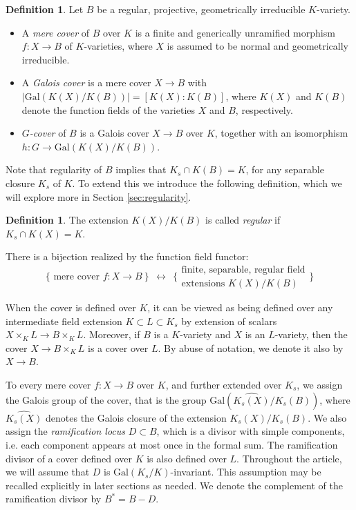 \documentclass[10pt]{amsart}
\theoremstyle{definition}
\newtheorem{definition}[theorem]{Definition}
\newcommand{\Gal}{{ \mathrm{Gal}}}
\begin{document}
\begin{definition}
Let $B$ be a regular, projective, geometrically irreducible $K$-variety. 
\begin{itemize}
  \item 
A  {\em mere cover} of $B$ over $K$ is a finite and generically unramified morphism $f\colon X \rightarrow B$  of $K$-varieties, where $X$ is assumed to be normal and geometrically irreducible. 
\item  A {\em Galois cover} is a mere cover $X \to B$ with $ |\Gal (K(X) / K(B)) |= [ K(X) : K(B)]  $, where $K(X)$ and $K(B)$ denote the function fields of the varieties $X$ and $B$, respectively. 
 \item 
{\em $G$-cover} of $B$ is a Galois cover $X \rightarrow B$ over $K$, together with an isomorphism $h\colon G \rightarrow \Gal(K(X)/K(B))$.
\end{itemize}
\end{definition}
Note that regularity of $B$ implies that $K_s \cap K(B) = K$, for any separable closure $K_s$ of $K$. To extend this we introduce the following definition, which we will explore more in Section \ref{sec:regularity}. 
\begin{definition}
  The extension $K(X)/K(B)$ is called {\em regular} if  $K_s \cap K(X)= K$.
\end{definition} 

There is a bijection realized by the function field functor:
\[
\Biggl\{\text{ mere cover } f \colon X \to B \ \Biggl\} \ \ \longleftrightarrow \ \  \Biggl\{ \begin{array}{c}
\text{finite, separable, regular field} \\
\text{extensions } K(X)/K(B)
\end{array} \Biggl\}
\]




When the cover is defined over $K$, it can be viewed as being defined over any intermediate field extension $K \subset L \subset K_s$ by extension of scalars $X\times_K L \to B \times_K L$. Moreover, if $B$ is a $K$-variety and $X$ is an $L$-variety, then the cover $X \to B \times_K L$ is a cover over $L$. By abuse of notation, we denote it also by $X \to B$.

To every mere cover $f \colon X\rightarrow B$ over $K$, and further extended over $K_s$,  we assign the Galois group of the cover, that is the group 
$\Gal(\widehat{K_s(X)}/K_s(B))$, where  $\widehat{K_s(X)}$ denotes the Galois closure of the extension $K_s(X)/K_s(B)$. 
We also assign the {\em ramification locus }  $D \subset B$, which is a divisor with simple components, i.e. each component appears at most once in the formal sum. The ramification divisor of a cover defined over $K$ is also defined over $L$. Throughout the article, we will assume that $D$ is $\Gal (K_s/K)$-invariant. This assumption may be recalled explicitly in later sections as needed. We denote the complement of the ramification divisor by $B^*= B - D$. 
\end{document}
